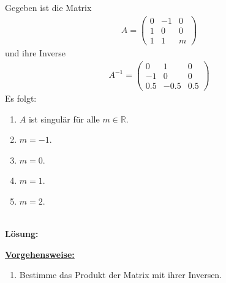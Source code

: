 \subsection*{}
Gegeben ist die Matrix
\begin{align*}
	A =
	\begin{pmatrix}
		0 & -1 & 0 \\
		1 & 0 & 0 \\
		1 & 1 & m
	\end{pmatrix}
\end{align*}
und ihre Inverse
\begin{align*}
	A^{-1} =
	\begin{pmatrix}
		0 & 1 & 0 \\
		-1 & 0 & 0 \\
		0.5 & -0.5 &0.5
	\end{pmatrix}
\end{align*}
Es folgt:
\renewcommand{\labelenumi}{(\alph{enumi})}
\begin{enumerate}
	\item 
	$ A $ ist singulär für alle $ m \in \mathbb{R} $.
	\item 
	$ m = -1 $.
	\item
	$ m = 0 $.
	\item
	$ m = 1 $.
	\item
	$ m = 2 $.
\end{enumerate}
\ \\
\textbf{Lösung:}
\begin{mdframed}
\underline{\textbf{Vorgehensweise:}}
\renewcommand{\labelenumi}{\theenumi.}
\begin{enumerate}
\item Bestimme das Produkt der Matrix mit ihrer Inversen.
\end{enumerate}
\end{mdframed}

